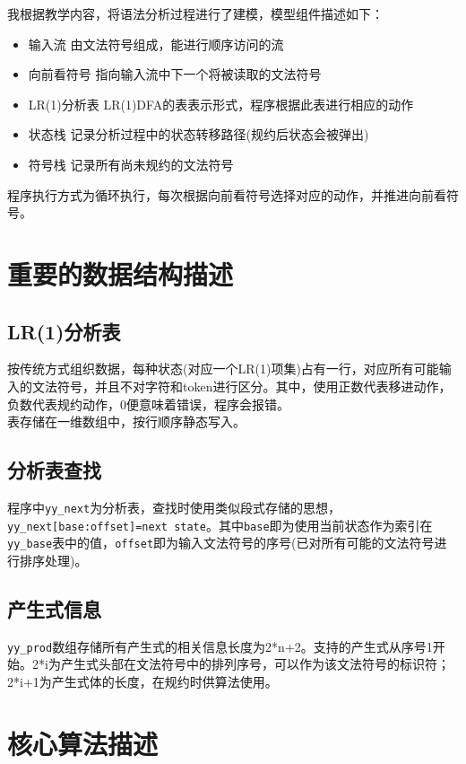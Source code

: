 \documentclass[a4paper]{ctexart} %
\begin{document}
	我根据教学内容，将语法分析过程进行了建模，模型组件描述如下：
	\begin{itemize}
        \item{输入流} 由文法符号组成，能进行顺序访问的流
        \item{向前看符号} 指向输入流中下一个将被读取的文法符号
        \item{LR(1)分析表} LR(1)DFA的表表示形式，程序根据此表进行相应的动作
        \item{状态栈} 记录分析过程中的状态转移路径(规约后状态会被弹出)
        \item{符号栈} 记录所有尚未规约的文法符号
	\end{itemize}
	程序执行方式为循环执行，每次根据向前看符号选择对应的动作，并推进向前看符号。


	\section{重要的数据结构描述}

	\subsection{LR(1)分析表}
	按传统方式组织数据，每种状态(对应一个LR(1)项集)占有一行，对应所有可能输入的文法符号，并且不对字符和token进行区分。其中，使用正数代表移进动作，负数代表规约动作，0便意味着错误，程序会报错。\\
	表存储在一维数组中，按行顺序静态写入。

	\subsection{分析表查找}
	程序中\verb|yy_next|为分析表，查找时使用类似段式存储的思想，\verb|yy_next[base:offset]=next state|。其中\verb|base|即为使用当前状态作为索引在\verb|yy_base|表中的值，\verb|offset|即为输入文法符号的序号(已对所有可能的文法符号进行排序处理)。

	\subsection{产生式信息}
	\verb|yy_prod|数组存储所有产生式的相关信息长度为2*n+2。支持的产生式从序号1开始。2*i为产生式头部在文法符号中的排列序号，可以作为该文法符号的标识符；2*i+1为产生式体的长度，在规约时供算法使用。

	\section{核心算法描述}
\end{document}
